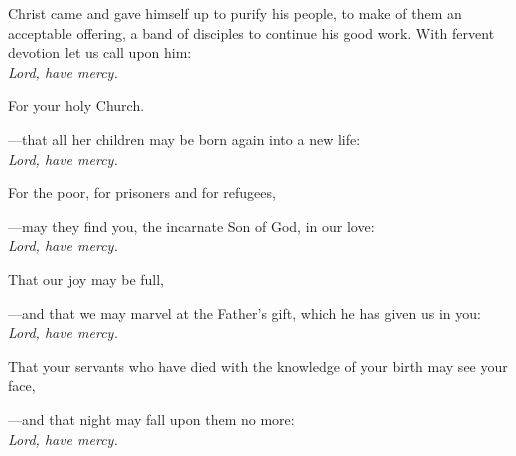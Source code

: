 \intercessions\indent

\begin{hangpar}

Christ came and gave himself up to purify his people, to make of them an acceptable offering, a band of disciples to continue his good work. With fervent devotion let us call upon him:\\
\emph{Lord, have mercy.}

\medskip For your holy Church.

{\color{red}---\thinspace }that all her children may be born again into a new life:\\
\emph{Lord, have mercy.}

\medskip For the poor, for prisoners and for refugees,

{\color{red}---\thinspace}may they find you, the incarnate Son of God, in our love:\\
\emph{Lord, have mercy.}

\medskip That our joy may be full,

{\color{red}---\thinspace}and that we may marvel at the Father's gift, which he has given us in you:\\
\emph{Lord, have mercy.}

\medskip That your servants who have died with the knowledge of your birth may see your face,

{\color{red}---\thinspace}and that night may fall upon them no more:\\
\emph{Lord, have mercy.}

\medskip

\end{hangpar}
